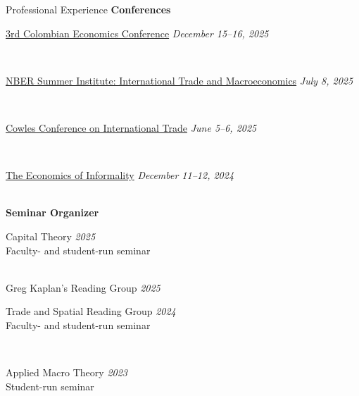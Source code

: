 \documentclass{resume} %
\begin{document}
		\begin{rSection}{Professional Experience}
			\textbf{Conferences}\\
			\parbox{\linewidth}{\href{https://economia.uniandes.edu.co/es/actualidad/eventos/3rd-colombian-economics-conference}{3rd Colombian Economics Conference} \hfill {\em December 15--16, 2025}}\\[0.25em]
			\parbox{\linewidth}{\href{https://www.nber.org/conferences/si-2025-international-trade-and-macroeconomics}{NBER Summer Institute: International Trade and Macroeconomics} \hfill {\em July 8, 2025}}\\[0.25em]
			\parbox{\linewidth}{\href{https://cowles.yale.edu/conferences/international-trade/2025}{Cowles Conference on International Trade} \hfill {\em June 5--6, 2025}}\\[0.25em]
			\parbox{\linewidth}{\href{https://evento.uniandes.edu.co/en/the-economics-of-informality-2024}{The Economics of Informality} \hfill {\em December 11--12, 2024}}\\[0.75em]

			\textbf{Seminar Organizer}\\
			\parbox{\linewidth}{Capital Theory \hfill {\em 2025}\\[-0.25em]
			{\small Faculty- and student-run seminar}}\\[0.35em]
			Greg Kaplan's Reading Group \hfill {\em 2025}\\[0.35em]
			\parbox{\linewidth}{Trade and Spatial Reading Group \hfill {\em 2024}\\[-0.25em]
			{\small Faculty- and student-run seminar}}\\[0.35em]
			\parbox{\linewidth}{Applied Macro Theory \hfill {\em 2023}\\[-0.25em]
			{\small Student-run seminar}}

	\end{rSection}
\end{document}
